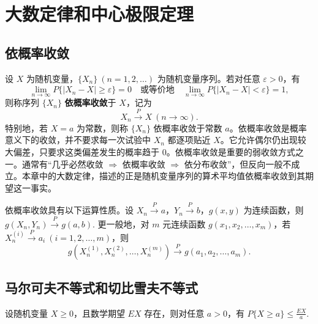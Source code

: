 \documentclass[lang=cn,11pt]{elegantbook}
\begin{document}
\chapter{大数定律和中心极限定理}

\section{依概率收敛}

\begin{definition}[依概率收敛] \label{def:convergence-prob}
设 \(X\) 为随机变量，\(\{X_n\}\ (n=1,2,\dots)\) 为随机变量序列。若对任意 \(\varepsilon > 0\)，有
\[
\lim_{n\to\infty} P\{|X_n - X| \geqslant \varepsilon\} = 0
\quad \text{或等价地} \quad
\lim_{n\to\infty} P\{|X_n - X| < \varepsilon\} = 1,
\]
则称序列 \(\{X_n\}\) \textbf{依概率收敛}于 \(X\)，记为
\[
X_n \stackrel{P}{\longrightarrow} X\ (n\to\infty).
\]
特别地，若 \(X = a\) 为常数，则称 \(\{X_n\}\) 依概率收敛于常数 \(a\)。依概率收敛是概率意义下的收敛，并不要求每一次试验中 \(X_n\) 都逐项贴近 \(X\)。它允许偶尔仍出现较大偏差，只要求这类偏差发生的概率趋于 0。依概率收敛是重要的弱收敛方式之一。通常有“几乎必然收敛 \(\Rightarrow\) 依概率收敛 \(\Rightarrow\) 依分布收敛”，但反向一般不成立。本章中的大数定律，描述的正是随机变量序列的算术平均值依概率收敛到其期望这一事实。
\end{definition}

\begin{property}[概率收敛运算性质]\label{prop:conv-prob-operation}
依概率收敛具有以下运算性质。设 \(X_n \stackrel{P}{\longrightarrow} a\)，\(Y_n \stackrel{P}{\longrightarrow} b\)，\(g(x,y)\) 为连续函数，则
\(
g(X_n, Y_n) \stackrel{P}{\longrightarrow} g(a, b).
\)
更一般地，对 \(m\) 元连续函数 \(g(x_1, x_2, \dots, x_m)\)，若 \(X_{n}^{(i)} \stackrel{P}{\longrightarrow} a_i\ (i=1,2,\dots,m)\)，则
\[
g\!\left(X_{n}^{(1)}, X_{n}^{(2)}, \dots, X_{n}^{(m)}\right) \stackrel{P}{\longrightarrow} g(a_1, a_2, \dots, a_m).
\]
\end{property}


\section{马尔可夫不等式和切比雪夫不等式}

\begin{theorem}[马尔可夫不等式] \label{thm:markov}
设随机变量 \(X\ge 0\)，且数学期望 \(EX\) 存在，则对任意 \(a>0\)，有
\(
P\{X\ge a\}\le \frac{EX}{a}.
\)
\end{theorem}
\end{document}
